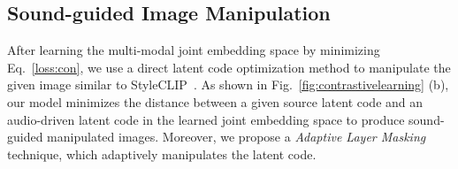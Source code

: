 \documentclass[10pt,twocolumn,letterpaper]{article}
\def\authornote#1#2#3{{\textcolor{#2}{\textsl{\small[#1: #3]}}}}
\newcommand{\wonmin}[1]{\authornote{Wonmin}{Blue}{#1}} %
\begin{document}
 
 
\subsection{Sound-guided Image Manipulation}
After learning the multi-modal joint embedding space by minimizing Eq.~\ref{loss:con}, we use a direct latent code optimization method to manipulate the given image similar to StyleCLIP~\cite{Patashnik_2021_ICCV}. As shown in Fig.~\ref{fig:contrastivelearning} (b), our model minimizes the distance between a given source latent code and an audio-driven latent code in the learned joint embedding space to produce sound-guided manipulated images. Moreover, we propose a {\it Adaptive Layer Masking} technique, which adaptively manipulates the latent code. 

 
 
\end{document}
